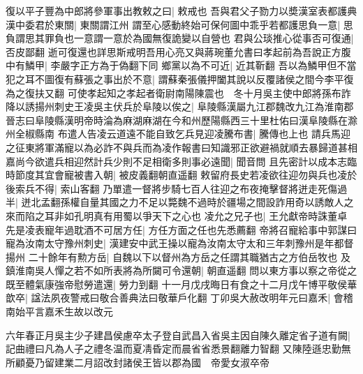 復以平子豐為中郎將參軍事出教敕之曰|{
	敕戒也}
吾與君父子勠力以奬漢室表都護典漢中委君於東關|{
	東關謂江州}
謂至心感動終始可保何圖中乖乎若都護思負一意|{
	思負謂思其罪負也一意謂一意於為國無復詭變以自營也}
君與公琰推心從事否可復通|{
	否皮鄙翻}
逝可復還也詳思斯戒明吾用心亮又與蔣琬董允書曰孝起前為吾說正方腹中有鱗甲|{
	李嚴字正方為于偽翻下同}
鄉黨以為不可近|{
	近其靳翻}
吾以為鱗甲但不當犯之耳不圖復有蘇張之事出於不意|{
	謂蘇秦張儀押闔其說以反覆諸侯之間今李平復為之復扶又翻}
可使孝起知之孝起者衛尉南陽陳震也　冬十月吳主使中郎將孫布詐降以誘揚州刺史王凌吳主伏兵於阜陵以俟之|{
	阜陵縣漢屬九江郡魏改九江為淮南郡晉志曰阜陵縣漢明帝時淪為麻湖麻湖在今和州歷陽縣西三十里杜佑曰漢阜陵縣在滁州全椒縣南}
布遣人告凌云道遠不能自致乞兵見迎凌騰布書|{
	騰傳也上也}
請兵馬迎之征東將軍滿寵以為必詐不與兵而為凌作報書曰知識邪正欲避禍就順去暴歸道甚相嘉尚今欲遣兵相迎然計兵少則不足相衛多則事必遠聞|{
	聞音問}
且先密計以成本志臨時節度其宜會寵被書入朝|{
	被皮義翻朝直遥翻}
敕留府長史若凌欲往迎勿與兵也凌於後索兵不得|{
	索山客翻}
乃單遣一督將步騎七百人往迎之布夜掩擊督將迸走死傷過半|{
	迸北孟翻孫權自量其國之力不足以斃魏不過時於疆場之間設詐用奇以誘敵人之來而陷之耳非如孔明真有用蜀以爭天下之心也}
凌允之兄子也|{
	王允獻帝時誅董卓}
先是凌表寵年過耽酒不可居方任|{
	方任方面之任也先悉薦翻}
帝將召寵給事中郭謀曰寵為汝南太守豫州刺史|{
	漢建安中武王操以寵為汝南太守太和三年刺豫州是年都督揚州}
二十餘年有勲方岳|{
	自魏以下以督州為方岳之任謂其職猶古之方伯岳牧也}
及鎮淮南吳人憚之若不如所表將為所闚可令還朝|{
	朝直遥翻}
問以東方事以察之帝從之既至體氣康強帝慰勞遣還|{
	勞力到翻}
十一月戊戌晦日有食之十二月戊午博平敬侯華歆卒|{
	諡法夙夜警戒曰敬合善典法曰敬華戶化翻}
丁卯吳大赦改明年元曰嘉禾|{
	會稽南始平言嘉禾生故以改元}


六年春正月吳主少子建昌侯慮卒太子登自武昌入省吳主因自陳久離定省子道有闕|{
	記曲禮曰凡為人子之禮冬温而夏凊昏定而晨省省悉景翻離力智翻}
又陳陸遜忠勤無所顧憂乃留建業二月詔改封諸侯王皆以郡為國　帝愛女淑卒帝

